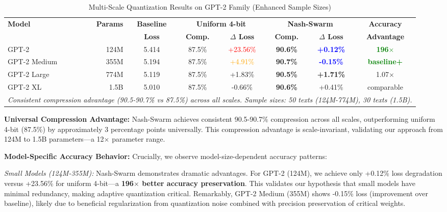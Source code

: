 \documentclass[11pt]{article}
\begin{document}
\begin{table*}[t]
\centering
\caption{Multi-Scale Quantization Results on GPT-2 Family (Enhanced Sample Sizes)}
\label{tab:multiscale_results}
\begin{tabular}{lrcccccc}
\toprule
\textbf{Model} & \textbf{Params} & \textbf{Baseline} & \multicolumn{2}{c}{\textbf{Uniform 4-bit}} & \multicolumn{2}{c}{\textbf{Nash-Swarm}} & \textbf{Accuracy} \\
 & & \textbf{Loss} & \textbf{Comp.} & \textbf{$\Delta$ Loss} & \textbf{Comp.} & \textbf{$\Delta$ Loss} & \textbf{Advantage} \\
\midrule
GPT-2        & 124M & 5.414 & 87.5\% & \textcolor{red}{+23.56\%} & \textbf{90.6\%} & \textbf{\textcolor{blue}{+0.12\%}} & \textcolor{green}{\textbf{196$\times$}} \\
GPT-2 Medium & 355M & 5.194 & 87.5\% & \textcolor{orange}{+4.91\%}  & \textbf{90.7\%} & \textbf{\textcolor{blue}{-0.15\%}} & \textcolor{green}{\textbf{baseline+}} \\
GPT-2 Large  & 774M & 5.119 & 87.5\% & +1.83\%  & \textbf{90.5\%} & \textbf{+1.71\%} & 1.07$\times$ \\
GPT-2 XL     & 1.5B & 5.010 & 87.5\% & -0.66\%  & \textbf{90.6\%} & +0.41\% & comparable \\
\midrule
\multicolumn{8}{l}{\textit{Consistent compression advantage (90.5-90.7\% vs 87.5\%) across all scales. Sample sizes: 50 texts (124M-774M), 30 texts (1.5B).}} \\
\bottomrule
\end{tabular}
\end{table*}

\textbf{Universal Compression Advantage:} Nash-Swarm achieves consistent 90.5-90.7\% compression across all scales, outperforming uniform 4-bit (87.5\%) by approximately 3 percentage points universally. This compression advantage is scale-invariant, validating our approach from 124M to 1.5B parameters---a 12$\times$ parameter range.

\textbf{Model-Specific Accuracy Behavior:} Crucially, we observe model-size-dependent accuracy patterns:

\textit{Small Models (124M-355M):} Nash-Swarm demonstrates dramatic advantages. For GPT-2 (124M), we achieve only +0.12\% loss degradation versus +23.56\% for uniform 4-bit---a \textbf{196$\times$ better accuracy preservation}. This validates our hypothesis that small models have minimal redundancy, making adaptive quantization critical. Remarkably, GPT-2 Medium (355M) shows -0.15\% loss (improvement over baseline), likely due to beneficial regularization from quantization noise combined with precision preservation of critical weights.
\end{document}
